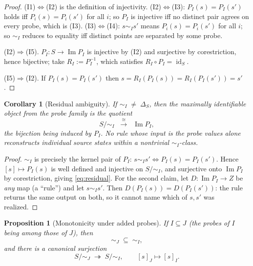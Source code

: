 \documentclass[11pt,reqno]{amsart}
\theoremstyle{plain}
\newtheorem{proposition}[theorem]{Proposition}
\newtheorem{corollary}[theorem]{Corollary}
\theoremstyle{definition}
\theoremstyle{remark}
\DeclareMathOperator{\Ima}{Im}
\DeclareMathOperator{\id}{id}
\begin{document}
\begin{proof}
(I1)$\Leftrightarrow$(I2) is the definition of injectivity. (I2)$\Leftrightarrow$(I3): $P_I(s)=P_I(s')$ holds iff $P_i(s)=P_i(s')$ for all $i$; so $P_I$ is injective iff no distinct pair agrees on every probe, which is (I3). (I3)$\Leftrightarrow$(I4): $s\sim_I s'$ means $P_i(s)=P_i(s')$ for all $i$; so $\sim_I$ reduces to equality iff distinct points are separated by some probe.

(I2)$\Rightarrow$(I5). $P_I\colon S\to\Ima P_I$ is injective by (I2) and surjective by corestriction, hence bijective; take $R_I:=P_I^{-1}$, which satisfies $R_I\circ P_I=\id_S$.

(I5)$\Rightarrow$(I2). If $P_I(s)=P_I(s')$ then $s=R_I(P_I(s))=R_I(P_I(s'))=s'$.
\end{proof}

\begin{corollary}[Residual ambiguity]\label{cor:residual}
If $\sim_I\;\neq\;\Delta_S$, then the maximally identifiable object from the probe family is the quotient
\begin{equation}\label{eq:residual}
S/\!\sim_I\;\;\xrightarrow{\ \cong\ }\;\;\Ima P_I ,
\end{equation}
the bijection being induced by $P_I$. No rule whose input is the probe values alone reconstructs individual source states within a nontrivial $\sim_I$-class.
\end{corollary}

\begin{proof}
$\sim_I$ is precisely the kernel pair of $P_I$: $s\sim_I s'\iff P_I(s)=P_I(s')$. Hence $[s]\mapsto P_I(s)$ is well defined and injective on $S/\!\sim_I$, and surjective onto $\Ima P_I$ by corestriction, giving \eqref{eq:residual}. For the second claim, let $D\colon\Ima P_I\to Z$ be \emph{any} map (a ``rule'') and let $s\sim_I s'$. Then $D(P_I(s))=D(P_I(s'))$: the rule returns the same output on both, so it cannot name which of $s,s'$ was realized.
\end{proof}

\begin{proposition}[Monotonicity under added probes]\label{prop:monotone}
If $I\subseteq J$ (the probes of $I$ being among those of $J$), then
\[
\sim_J\;\subseteq\;\sim_I ,
\]
and there is a canonical \emph{surjection}
\begin{equation}\label{eq:canonicalsurj}
S/\!\sim_J\;\twoheadrightarrow\;S/\!\sim_I,\qquad [s]_J\longmapsto[s]_I .
\end{equation}
\end{proposition}
\end{document}
